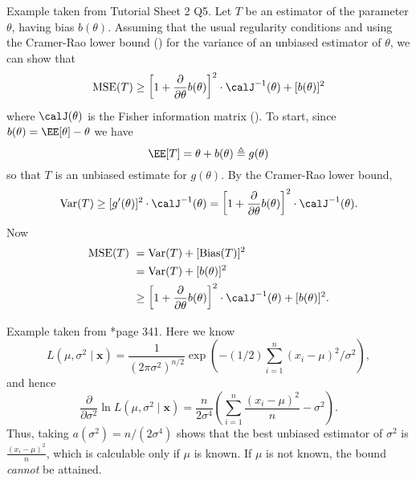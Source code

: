 \begin{exam} \label{exam: MSE_Cramer_ineq}
    Example taken from Tutorial Sheet 2 Q5. Let $T$ be an estimator of the parameter $\theta$, having bias $b(\theta)$. Assuming that the usual regularity conditions and using the Cramer-Rao lower bound () for the variance of an unbiased estimator of $\theta$, we can show that
    \begin{equation*}
        \MSE (T) \geq \left[ 1 + \frac{\partial}{\partial \theta} b(\theta) \right]^2 \cdot \calJ^{-1} (\theta) + [b(\theta)]^2
    \end{equation*}
    where $\calJ (\theta)$ is the Fisher information matrix (). To start, since $b(\theta) = \EE [\theta] - \theta$ we have
    \begin{equation*}
        \EE [T] = \theta + b(\theta) \triangleq g(\theta)
    \end{equation*}
    so that $T$ is an unbiased estimate for $g(\theta)$. By the Cramer-Rao lower bound,
    \begin{equation*}
        \Var (T) \geq [g'(\theta)]^2 \cdot \calJ^{-1} (\theta) = \left[ 1 + \frac{\partial}{\partial \theta} b(\theta) \right]^2 \cdot \calJ^{-1} (\theta).
    \end{equation*}
    Now
    \begin{align*}
        \MSE (T) \
         & = \Var (T) + [\Bias (T)]^2                                                                                                     \\
         & = \Var (T) + [b(\theta)]^2                                                                                                     \\
         & \geq \left[ 1 + \frac{\partial}{\partial \theta} b(\theta) \right]^2 \cdot \calJ^{-1} (\theta) + [b(\theta)]^2.
    \end{align*}
\end{exam}

\begin{exam} \label{exam: norm_mse_p2}
    Example taken from \cite{CasellaGeorge2001SI}*{page 341}. Here we know
    \begin{equation*}
        L(\mu , \sigma^2 \mid \bm{x}) = \frac{1}{(2 \pi \sigma^2)^{n/2}} \exp \left( -(1/2) \sum_{i=1}^{n} (x_i - \mu)^2 / \sigma^2 \right),
    \end{equation*}
    and hence
    \begin{equation*}
        \frac{\partial}{\partial \sigma^2} \ln L(\mu , \sigma^2 \mid \bm{x}) = \frac{n}{2 \sigma^4} \left( \sum_{i=1}^{n} \frac{(x_i - \mu)^2}{n} - \sigma^2 \right).
    \end{equation*}
    Thus, taking $a(\sigma^2) = n / (2 \sigma^4)$ shows that the best unbiased estimator of $\sigma^2$ is $\frac{(x_i - \mu)^2}{n}$, which is calculable only if $\mu$ is known. If $\mu$ is not known, the bound {\it cannot} be attained.
\end{exam}

